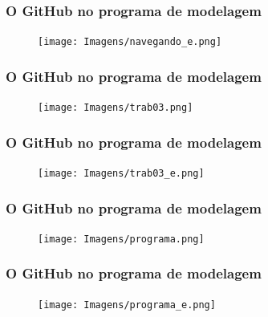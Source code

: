 \documentclass[10pt]{beamer} %
\begin{document}
\begin{frame}
\frametitle{O GitHub no programa de modelagem}

\begin{block}{}
\begin{figure}[H]
\centering
\texttt{[image: Imagens/navegando\_e.png]}
\end{figure}

\end{block}
\end{frame}

\begin{frame}
\frametitle{O GitHub no programa de modelagem}

\begin{block}{}
\begin{figure}[H]
\centering
\texttt{[image: Imagens/trab03.png]}
\end{figure}

\end{block}
\end{frame}


\begin{frame}
\frametitle{O GitHub no programa de modelagem}

\begin{block}{}
\begin{figure}[H]
\centering
\texttt{[image: Imagens/trab03\_e.png]}
\end{figure}

\end{block}
\end{frame}

\begin{frame}
\frametitle{O GitHub no programa de modelagem}

\begin{block}{}
\begin{figure}[H]
\centering
\texttt{[image: Imagens/programa.png]}
\end{figure}

\end{block}
\end{frame}

\begin{frame}
\frametitle{O GitHub no programa de modelagem}

\begin{block}{}
\begin{figure}[H]
\centering
\texttt{[image: Imagens/programa\_e.png]}
\end{figure}

\end{block}
\end{frame}
\end{document}
